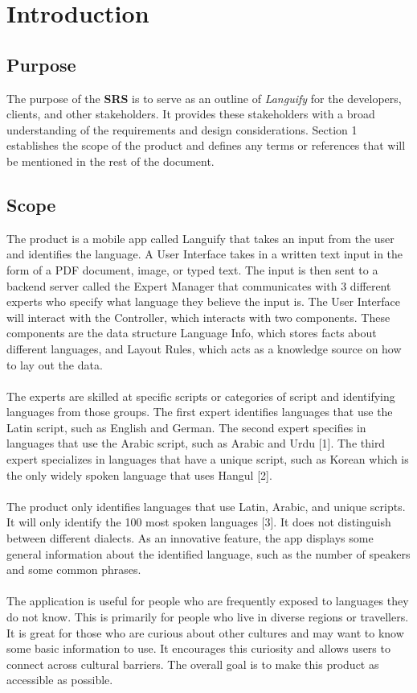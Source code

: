 \section{Introduction}
\label{sec:introduction}


\subsection{Purpose}
\label{sub:purpose}
The purpose of the \textbf{SRS} is to serve as an outline of \textit{Languify} for the developers, clients, and other stakeholders. It provides these stakeholders with a broad understanding of the requirements and design considerations. Section 1 establishes the scope of the product and defines any terms or references that will be mentioned in the rest of the document.


\subsection{Scope}
\label{sub:scope}
The product is a mobile app called Languify that takes an input from the user and identifies the language. 
A User Interface takes in a written text input in the form of a PDF document, image, or typed text. 
The input is then sent to a backend server called the Expert Manager that communicates with 3 different experts who specify what language they believe the input is. 
The User Interface will interact with the Controller, which interacts with two components.
These components are the data structure Language Info, which stores facts about different languages, and Layout Rules, which acts as a knowledge source on how to lay out the data.\\ \\
The experts are skilled at specific scripts or categories of script and identifying languages from those groups. The first expert identifies languages that use the Latin script, such as English and German. 
The second expert specifies in languages that use the Arabic script, such as Arabic and Urdu [1]. The third expert specializes in languages that have a unique script, such as Korean which is the only widely spoken language that uses Hangul [2]. \\ \\
The product only identifies languages that use Latin, Arabic, and unique scripts. It will only identify the 100 most spoken languages [3]. It does not distinguish between different dialects. As an innovative feature, the app displays some general information about the identified language, such as the number of speakers and some common phrases.\\ \\
The application is useful for people who are frequently exposed to languages they do not know. This is primarily for people who live in diverse regions or travellers. It is great for those who are curious about other cultures and may want to know some basic information to use. It encourages this curiosity and allows users to connect across cultural barriers. The overall goal is to make this product as accessible as possible.


